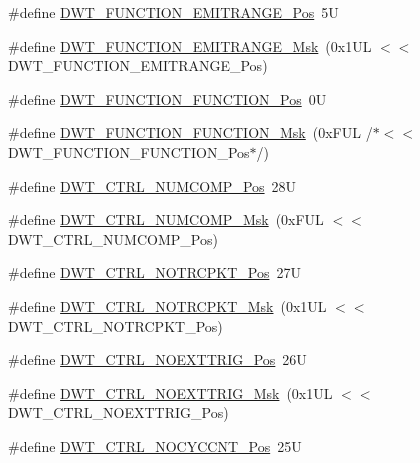 \begin{DoxyCompactItemize}
\item 
\#define \hyperlink{group___c_m_s_i_s___d_w_t_ga41d5b332216baa8d29561260a1b85659}{D\+W\+T\+\_\+\+F\+U\+N\+C\+T\+I\+O\+N\+\_\+\+E\+M\+I\+T\+R\+A\+N\+G\+E\+\_\+\+Pos}~5U
\item 
\#define \hyperlink{group___c_m_s_i_s___d_w_t_gad46dd5aba29f2e28d4d3f50b1d291f41}{D\+W\+T\+\_\+\+F\+U\+N\+C\+T\+I\+O\+N\+\_\+\+E\+M\+I\+T\+R\+A\+N\+G\+E\+\_\+\+Msk}~(0x1\+U\+L $<$$<$ D\+W\+T\+\_\+\+F\+U\+N\+C\+T\+I\+O\+N\+\_\+\+E\+M\+I\+T\+R\+A\+N\+G\+E\+\_\+\+Pos)
\item 
\#define \hyperlink{group___c_m_s_i_s___d_w_t_ga5797b556edde2bbaa4d33dcdb1a891bb}{D\+W\+T\+\_\+\+F\+U\+N\+C\+T\+I\+O\+N\+\_\+\+F\+U\+N\+C\+T\+I\+O\+N\+\_\+\+Pos}~0U
\item 
\#define \hyperlink{group___c_m_s_i_s___d_w_t_ga3b2cda708755ecf5f921d08b25d774d1}{D\+W\+T\+\_\+\+F\+U\+N\+C\+T\+I\+O\+N\+\_\+\+F\+U\+N\+C\+T\+I\+O\+N\+\_\+\+Msk}~(0x\+F\+U\+L /$\ast$$<$$<$ D\+W\+T\+\_\+\+F\+U\+N\+C\+T\+I\+O\+N\+\_\+\+F\+U\+N\+C\+T\+I\+O\+N\+\_\+\+Pos$\ast$/)
\item 
\#define \hyperlink{group___c_m_s_i_s___d_w_t_gaac44b9b7d5391a7ffef129b7f6c84cd7}{D\+W\+T\+\_\+\+C\+T\+R\+L\+\_\+\+N\+U\+M\+C\+O\+M\+P\+\_\+\+Pos}~28U
\item 
\#define \hyperlink{group___c_m_s_i_s___d_w_t_gaa3d37d68c2ba73f2026265584c2815e7}{D\+W\+T\+\_\+\+C\+T\+R\+L\+\_\+\+N\+U\+M\+C\+O\+M\+P\+\_\+\+Msk}~(0x\+F\+U\+L $<$$<$ D\+W\+T\+\_\+\+C\+T\+R\+L\+\_\+\+N\+U\+M\+C\+O\+M\+P\+\_\+\+Pos)
\item 
\#define \hyperlink{group___c_m_s_i_s___d_w_t_gaa82840323a2628e7f4a2b09b74fa73fd}{D\+W\+T\+\_\+\+C\+T\+R\+L\+\_\+\+N\+O\+T\+R\+C\+P\+K\+T\+\_\+\+Pos}~27U
\item 
\#define \hyperlink{group___c_m_s_i_s___d_w_t_ga04d8bb0a065ca38e2e5f13a97e1f7073}{D\+W\+T\+\_\+\+C\+T\+R\+L\+\_\+\+N\+O\+T\+R\+C\+P\+K\+T\+\_\+\+Msk}~(0x1\+U\+L $<$$<$ D\+W\+T\+\_\+\+C\+T\+R\+L\+\_\+\+N\+O\+T\+R\+C\+P\+K\+T\+\_\+\+Pos)
\item 
\#define \hyperlink{group___c_m_s_i_s___d_w_t_gad997b9026715d5609b5a3b144eca42d0}{D\+W\+T\+\_\+\+C\+T\+R\+L\+\_\+\+N\+O\+E\+X\+T\+T\+R\+I\+G\+\_\+\+Pos}~26U
\item 
\#define \hyperlink{group___c_m_s_i_s___d_w_t_gacc7d15edf7a27147c422099ab475953e}{D\+W\+T\+\_\+\+C\+T\+R\+L\+\_\+\+N\+O\+E\+X\+T\+T\+R\+I\+G\+\_\+\+Msk}~(0x1\+U\+L $<$$<$ D\+W\+T\+\_\+\+C\+T\+R\+L\+\_\+\+N\+O\+E\+X\+T\+T\+R\+I\+G\+\_\+\+Pos)
\item 
\#define \hyperlink{group___c_m_s_i_s___d_w_t_ga337f6167d960f57f12aa382ffecce522}{D\+W\+T\+\_\+\+C\+T\+R\+L\+\_\+\+N\+O\+C\+Y\+C\+C\+N\+T\+\_\+\+Pos}~25U

\end{DoxyCompactItemize}
